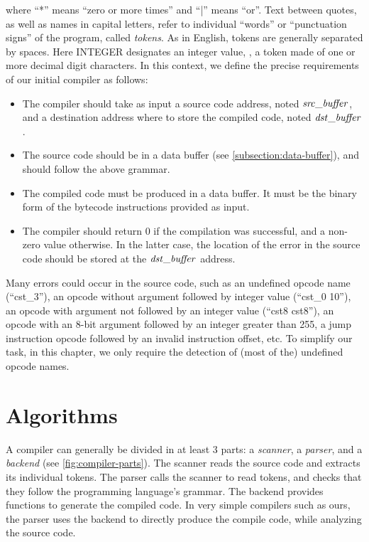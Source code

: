 \noindent where ``*'' means ``zero or more times'' and ``|'' means ``or''. Text
between quotes, as well as names in capital letters, refer to individual
``words'' or ``punctuation signs'' of the program, called {\em tokens}. As in
English, tokens are generally separated by spaces. Here INTEGER designates an
integer value, \ie, a token made of one or more decimal digit characters. In
this context, we define the precise requirements of our initial compiler as
follows:
\begin{itemize}
  \item The compiler should take as input a source code address, noted
  $\it{src\_buffer}$, and a destination address where to store the compiled
  code, noted $\it{dst\_buffer}$.

  \item The source code should be in a data buffer (see
  \cref{subsection:data-buffer}), and should follow the above grammar.

  \item The compiled code must be produced in a data buffer. It must be the
  binary form of the bytecode instructions provided as input.

  \item The compiler should return 0 if the compilation was successful, and a
  non-zero value otherwise. In the latter case, the location of the error in
  the source code should be stored at the $\it{dst\_buffer}$ address.
\end{itemize}

Many errors could occur in the source code, such as an undefined opcode name
(``cst\_3''), an opcode without argument followed by integer value (``cst\_0
10''), an opcode with argument not followed by an integer value (``cst8
cst8''), an opcode with an 8-bit argument followed by an integer greater than
255, a jump instruction opcode followed by an invalid instruction offset, etc.
To simplify our task, in this chapter, we only require the detection of (most
of the) undefined opcode names.

\section{Algorithms}

A compiler can generally be divided in at least 3 parts: a {\em scanner}, a {\em
parser}, and a {\em backend} (see \cref{fig:compiler-parts}). The scanner reads
the source code and extracts its individual tokens. The parser calls the scanner
to read tokens, and checks that they follow the programming language's grammar.
The backend provides functions to generate the compiled code. In very simple
compilers such as ours, the parser uses the backend to directly produce the
compile code, while analyzing the source code.

